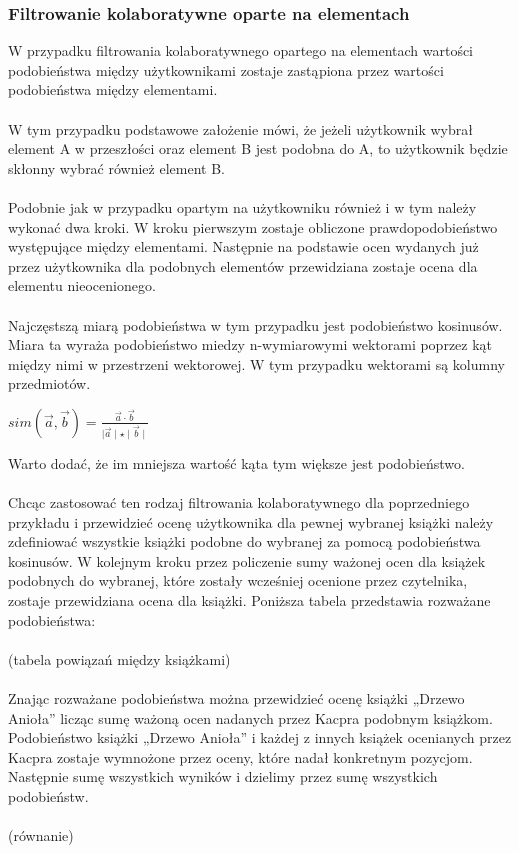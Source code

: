 \documentclass[12pt,a4paper]{report}
\begin{document}
\subsubsection{Filtrowanie kolaboratywne oparte na  elementach}
W przypadku filtrowania kolaboratywnego opartego na elementach wartości podobieństwa między użytkownikami zostaje zastąpiona przez  wartości podobieństwa między elementami.
\\
\\W tym przypadku podstawowe założenie mówi, że jeżeli użytkownik wybrał element A w przeszłości oraz element B jest podobna do A, to użytkownik będzie skłonny wybrać również element B.
\\
\\Podobnie jak w przypadku opartym na użytkowniku również i w tym należy wykonać dwa kroki. W kroku pierwszym zostaje obliczone prawdopodobieństwo występujące między elementami. Następnie na podstawie ocen wydanych już przez użytkownika dla podobnych elementów przewidziana zostaje ocena dla elementu nieocenionego.
\\
\\Najczęstszą miarą podobieństwa w tym przypadku jest podobieństwo kosinusów. Miara ta wyraża  podobieństwo miedzy n-wymiarowymi wektorami poprzez kąt między nimi w przestrzeni wektorowej. W tym przypadku wektorami są kolumny przedmiotów.
\begin{center}
$ sim (\vec{a},\vec{b}) = \frac{\vec{a} \cdot \vec{b}}{\mid \vec{a} \mid \star \mid \vec{b} \mid }$
\end{center}
Warto dodać, że im mniejsza wartość kąta tym większe jest podobieństwo.
\\
\\Chcąc zastosować ten rodzaj filtrowania kolaboratywnego dla poprzedniego przykładu i przewidzieć ocenę użytkownika dla pewnej wybranej książki należy zdefiniować wszystkie książki podobne do wybranej za pomocą podobieństwa kosinusów. W kolejnym kroku przez policzenie sumy ważonej ocen dla książek podobnych do wybranej, które zostały wcześniej ocenione przez czytelnika, zostaje przewidziana ocena dla książki. Poniższa tabela przedstawia rozważane podobieństwa:
\\
\\(tabela powiązań między książkami)
\\
\\Znając rozważane podobieństwa można przewidzieć ocenę książki „Drzewo Anioła” licząc sumę ważoną ocen nadanych przez Kacpra podobnym książkom. Podobieństwo książki „Drzewo Anioła” i każdej z innych książek ocenianych przez Kacpra zostaje wymnożone przez oceny, które nadał konkretnym pozycjom. Następnie sumę wszystkich wyników i dzielimy przez sumę wszystkich podobieństw.
\\
\\(równanie)
\\
\end{document}
